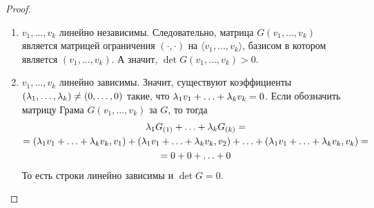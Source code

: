 \begin{proof}\
	\begin{enumerate}
		\item $v_1, \ldots, v_k$ линейно независимы. Следовательно, матрица $G(v_1, \ldots, v_k)$ является матрицей ограничения $(\cdot, \cdot)$ на $\langle v_1, \ldots, v_k\rangle$, базисом в котором является $(v_1, \ldots, v_k)$. А значит, $\det G(v_1, \ldots, v_k) > 0$.
		\item $v_1, \ldots, v_k$  линейно зависимы. Значит, существуют коэффициенты $(\lambda_1, \ldots, \lambda_k) \neq (0,  \ldots, 0)$ такие, что $\lambda_1v_1 + \ldots + \lambda_kv_k = 0$. Если обозначить матрицу Грама $G(v_1, \ldots, v_k)$ за $G$, то тогда
		\begin{gather*}
		\lambda_1 G_{(1)} + \ldots + \lambda_kG_{(k)} = \\ =
		(\lambda_1v_1 + \ldots + \lambda_kv_k, v_1) + (\lambda_1v_1 + \ldots + \lambda_kv_k, v_2) + \ldots + (\lambda_1v_1 + \ldots + \lambda_kv_k, v_k) =\\= 0 + 0 + \ldots + 0
		\end{gather*}
		То есть строки линейно зависимы и $\det G = 0$.
	\end{enumerate}
\end{proof}

